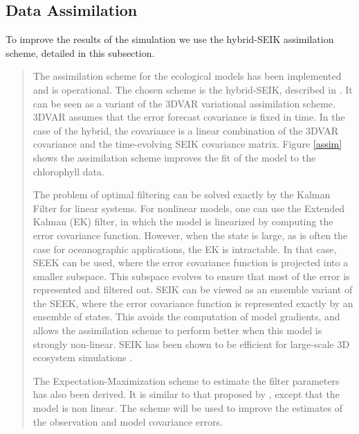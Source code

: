 \subsection{Data Assimilation}

To improve the results of the simulation we use the hybrid-SEIK assimilation
scheme, detailed in this subsection.

\begin{quotation} The assimilation scheme for the ecological models has been
implemented and is operational. The chosen scheme is the hybrid-SEIK, described
in \citet{Hamill2000}. It can be seen as a variant of the 3DVAR variational
assimilation scheme. 3DVAR assumes that the error forecast covariance is fixed
in time. In the case of the hybrid, the covariance is a linear combination of
the 3DVAR covariance and the time-evolving SEIK covariance matrix. Figure
\ref{assim} shows the assimilation scheme improves the fit of the model to the
chlorophyll data.

The problem of optimal filtering can be solved exactly by the Kalman Filter for
linear systems. For nonlinear models, one can use the Extended Kalman (EK)
filter, in which the model is linearized by computing the error covariance
function.  However, when the state is large, as is often the case for
oceanographic applications, the EK is intractable. In that case, SEEK can be
used, where the error covariance function is projected into a smaller subspace.
This subspace evolves to ensure that most of the error is represented and
filtered out. SEIK can be viewed as an ensemble variant of the SEEK, where the
error covariance function is represented exactly by an ensemble of states. This
avoids the computation of model gradients, and allows the assimilation scheme
to perform better when this model is strongly non-linear. SEIK has been shown
to be efficient for large-scale 3D ecosystem simulations
\citep{Triantafyllou2003}.


The Expectation-Maximization scheme to estimate the filter parameters has also
been derived. It is similar to that proposed by \citet{Tandeo2014}, except that
the model is non linear. The scheme will be used to improve the estimates of
the observation and model covariance errors.  \end{quotation}

